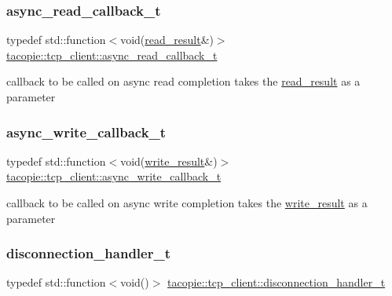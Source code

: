 \subsubsection{\texorpdfstring{async\+\_\+read\+\_\+callback\+\_\+t}{async\_read\_callback\_t}}
{\footnotesize\ttfamily typedef std\+::function$<$void(\hyperlink{structtacopie_1_1tcp__client_1_1read__result}{read\+\_\+result}\&)$>$ \hyperlink{classtacopie_1_1tcp__client_acdf9dea8bac6c56f7b04ce38b9432322}{tacopie\+::tcp\+\_\+client\+::async\+\_\+read\+\_\+callback\+\_\+t}}

callback to be called on async read completion takes the \hyperlink{structtacopie_1_1tcp__client_1_1read__result}{read\+\_\+result} as a parameter \mbox{\label{classtacopie_1_1tcp__client_ad48b8c8dff8a77490eb2e3e802c82b97}} 
\subsubsection{\texorpdfstring{async\+\_\+write\+\_\+callback\+\_\+t}{async\_write\_callback\_t}}
{\footnotesize\ttfamily typedef std\+::function$<$void(\hyperlink{structtacopie_1_1tcp__client_1_1write__result}{write\+\_\+result}\&)$>$ \hyperlink{classtacopie_1_1tcp__client_ad48b8c8dff8a77490eb2e3e802c82b97}{tacopie\+::tcp\+\_\+client\+::async\+\_\+write\+\_\+callback\+\_\+t}}

callback to be called on async write completion takes the \hyperlink{structtacopie_1_1tcp__client_1_1write__result}{write\+\_\+result} as a parameter \mbox{\label{classtacopie_1_1tcp__client_aca5df52e5ee6fa673cf212532ada1453}} 
\subsubsection{\texorpdfstring{disconnection\+\_\+handler\+\_\+t}{disconnection\_handler\_t}}
{\footnotesize\ttfamily typedef std\+::function$<$void()$>$ \hyperlink{classtacopie_1_1tcp__client_aca5df52e5ee6fa673cf212532ada1453}{tacopie\+::tcp\+\_\+client\+::disconnection\+\_\+handler\+\_\+t}}

